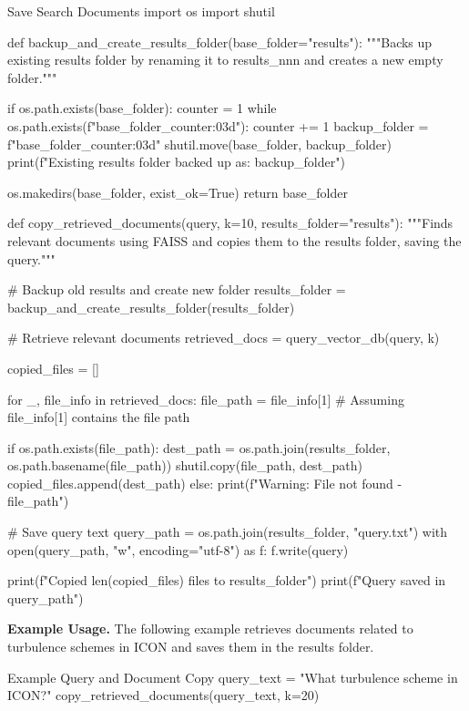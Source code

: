 \begin{codeonly}{Save Search Documents}
import os
import shutil

def backup_and_create_results_folder(base_folder="results"):
    """Backs up existing results folder by renaming it to results_nnn and creates a new empty folder."""
    
    if os.path.exists(base_folder):
        counter = 1
        while os.path.exists(f"{base_folder}_{counter:03d}"):
            counter += 1
        backup_folder = f"{base_folder}_{counter:03d}"
        shutil.move(base_folder, backup_folder)
        print(f"Existing results folder backed up as: {backup_folder}")

    os.makedirs(base_folder, exist_ok=True)
    return base_folder

def copy_retrieved_documents(query, k=10, results_folder="results"):
    """Finds relevant documents using FAISS and copies them to the results folder, saving the query."""
    
    # Backup old results and create new folder
    results_folder = backup_and_create_results_folder(results_folder)

    # Retrieve relevant documents
    retrieved_docs = query_vector_db(query, k)
    
    copied_files = []
    
    for _, file_info in retrieved_docs:
        file_path = file_info[1]  # Assuming file_info[1] contains the file path

        if os.path.exists(file_path):
            dest_path = os.path.join(results_folder, os.path.basename(file_path))
            shutil.copy(file_path, dest_path)
            copied_files.append(dest_path)
        else:
            print(f"Warning: File not found - {file_path}")

    # Save query text
    query_path = os.path.join(results_folder, "query.txt")
    with open(query_path, "w", encoding="utf-8") as f:
        f.write(query)
    
    print(f"Copied {len(copied_files)} files to {results_folder}")
    print(f"Query saved in {query_path}")
\end{codeonly}

\bigskip
{\bf Example Usage.}
The following example retrieves documents related to turbulence schemes in ICON and saves them in the 
results folder.

\begin{codeonly}{Example Query and Document Copy}
query_text = "What turbulence scheme in ICON?"
copy_retrieved_documents(query_text, k=20)
\end{codeonly}

